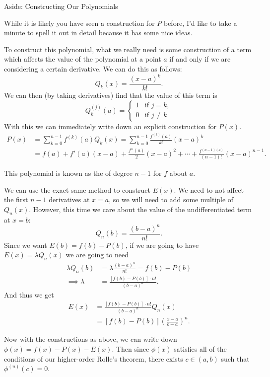\begin{aside}{Aside: Constructing Our Polynomials}

	While it is likely you have seen a construction for $P$ before, I'd like to take a minute to spell it out in detail because it has some nice ideas.

	To construct this polynomial, what we really need is some construction of a term which affects the value of the polynomial at a point $a$ if and only if we are considering a certain derivative. We can do this as follows:
	$$
		Q_{k}(x) = \frac{(x - a)^k}{k!}.
	$$
	We can then (by taking derivatives) find that the value of this term is
	$$
	Q_k^{(j)}(a) = \begin{cases}
        1 &\mbox{if } j = k, \\
        0 &\mbox{if } j \neq k
       \end{cases}
	$$
	With this we can immediately write down an explicit construction for $P(x)$.
	\begin{align*}
		P(x) &= \sum_{k = 0}^{n - 1} f^{(k)}(a) Q_k(x) = \sum_{k = 0}^{n - 1} \frac{f^{(k)}(a)}{k!}(x - a)^k \\
		&= f(a) + f'(a) (x - a) + \frac{f''(a)}{2} (x - a)^2 + \cdots + \frac{f^{(n - 1)(a)}}{(n - 1)!} (x - a)^{n - 1}.
	\end{align*}

	This polynomial is known as the  of degree $n - 1$ for $f$ about $a$. 

	We can use the exact same method to construct $E(x)$. 
	We need to not affect the first $n - 1$ derivatives at $x = a$, so we will need to add some multiple of $Q_{n}(x)$. However, this time we care about the value of the undifferentiated term at $x = b$:
	$$
	Q_{n}(b) = \frac{(b - a)^n}{n!}.
	$$
	Since we want $E(b) = f(b) - P(b)$, if we are going to have $E(x) = \lambda Q_n(x)$ we are going to need
	\begin{align*}
		\lambda Q_{n}(b) &= \lambda \frac{(b - a)^n}{n!} = f(b) - P(b) \\
\implies \lambda &= \frac{[f(b) - P(b)] \cdot n!}{(b - a)^n}.
	\end{align*}
	And thus we get
	\begin{align*}
		E(x) &= \frac{[f(b) - P(b)] \cdot n!}{(b - a)^n} Q_n(x) \\
		&= \left[f(b) - P(b)\right]\left(\frac{x - a}{b - a}\right)^n.
	\end{align*}
\end{aside}

Now with the constructions as above, we can write down $\phi(x) = f(x) - P(x) - E(x)$.
Then since $\phi(x)$ satisfies all of the conditions of our higher-order Rolle's theorem, there exists $c \in (a, b)$ such that $\phi^{(n)}(c) = 0$. 

